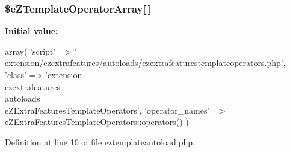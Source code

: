 \hypertarget{eztemplateautoload_8php_a495af2bdf40c64a9e0c519ae1f0febd9}{
\subsubsection[{\$e\-Z\-Template\-Operator\-Array}]{\setlength{\rightskip}{0pt plus 5cm}\$e\-Z\-Template\-Operator\-Array\mbox{[}$\,$\mbox{]}}}\label{eztemplateautoload_8php_a495af2bdf40c64a9e0c519ae1f0febd9}
{\bfseries Initial value\-:}
\begin{DoxyCode}
 array( 'script' => '
      extension/ezextrafeatures/autoloads/ezextrafeaturestemplateoperators.php',
                                    'class' => 'extension\\ezextrafeatures\\
      autoloads\\eZExtraFeaturesTemplateOperators',
                                    'operator_names' => 
      eZExtraFeaturesTemplateOperators::operators()
)
\end{DoxyCode}


Definition at line 10 of file eztemplateautoload.\-php.

